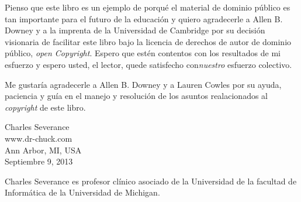 Pienso que este libro es un ejemplo de porqu\'e el material de dominio p\'ublico es tan importante para el futuro de la educaci\'on y quiero agradecerle a Allen B. Downey y a la imprenta de la Universidad de Cambridge por su decisi\'on visionaria de facilitar este libro bajo la licencia de derechos de autor de dominio p\'ublico, \textit{open Copyright}. Espero que est\'en contentos con los resultados de mi esfuerzo y espero usted, el lector, quede satisfecho con\emph{nuestro} esfuerzo colectivo.

Me gustar\'ia agradecerle a Allen B. Downey y a Lauren Cowles por su ayuda,
paciencia y gu\'ia en el manejo y resoluci\'on de los asuntos realacionados al \textit{copyright} de este libro.

Charles Severance\\
www.dr-chuck.com\\
Ann Arbor, MI, USA\\
Septiembre 9, 2013

Charles Severance es profesor cl\'inico asociado de la Universidad de la facultad de Inform\'atica de la Universidad de Michigan.

\clearemptydoublepage

\begin{latexonly}

\tableofcontents

\clearemptydoublepage

\end{latexonly}

\mainmatter

